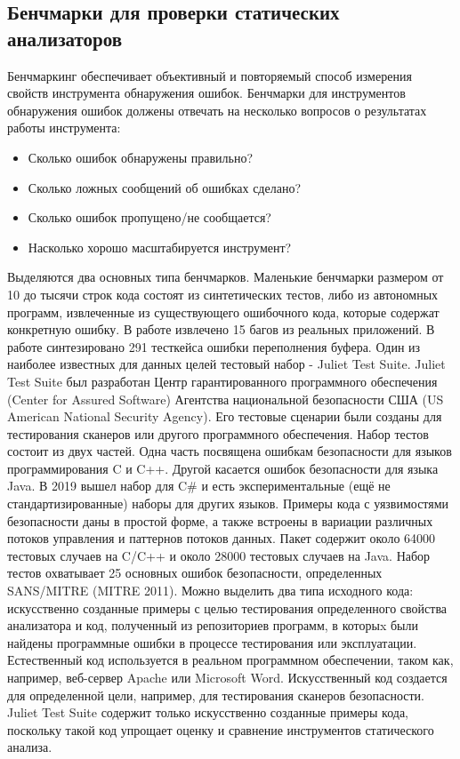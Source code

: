 \subsection{Бенчмарки для проверки статических анализаторов}
Бенчмаркинг обеспечивает объективный и повторяемый способ измерения свойств инструмента обнаружения ошибок. Бенчмарки для инструментов обнаружения 
ошибок должены отвечать на несколько вопросов о результатах работы инструмента\cite{BegBunch}: 
\begin{itemize}
    \item Сколько ошибок обнаружены правильно?
    \item Сколько ложных сообщений об ошибках сделано?
    \item Сколько ошибок пропущено/не сообщается?
    \item Насколько хорошо масштабируется инструмент?
\end{itemize}

Выделяются два основных типа бенчмарков. 
Маленькие бенчмарки размером от 10 до тысячи строк кода состоят из синтетических тестов, либо из автономных программ, извлеченные из существующего 
ошибочного кода, которые содержат конкретную ошибку. В работе\cite{Zitser} извлечено 15 багов из реальных приложений. В работе\cite{Kratkiewicz} синтезировано 
291 тесткейса ошибки переполнения буфера. Один из наиболее известных для данных целей тестовый набор - Juliet Test Suite\cite{NIST}. Juliet Test Suite был разработан Центр гарантированного 
программного обеспечения (Center for Assured Software) Агентства национальной безопасности США (US American National Security Agency).
Его тестовые сценарии были созданы для тестирования сканеров или другого программного обеспечения. Набор тестов состоит из двух частей. Одна часть 
посвящена ошибкам безопасности для языков программирования C и C++. Другой касается ошибок безопасности для языка Java. В 2019 вышел набор для C\# и 
есть экспериментальные (ещё не стандартизированные) наборы для других языков. Примеры кода с уязвимостями 
безопасности даны в простой форме, а также встроены в вариации различных потоков управления и паттернов потоков данных. Пакет содержит около 64000 
тестовых случаев на C/C++ и около 28000 тестовых случаев на Java. Набор тестов охватывает 25 основных ошибок безопасности, определенных SANS/MITRE 
(MITRE 2011)\cite{MITRE}. Можно выделить два типа исходного кода: искусственно созданные примеры с целью тестирования определенного свойства 
анализатора и код, полученный из репозиториев программ, в которыx были найдены программные ошибки в процессе тестирования или эксплуатации.
Естественный код используется в реальном программном обеспечении, таком 
как, например, веб-сервер Apache или Microsoft Word. Искусственный код создается для определенной цели, например, для тестирования сканеров 
безопасности. Juliet Test Suite содержит только искусственно созданные примеры кода, поскольку такой код упрощает оценку и сравнение инструментов 
статического анализа. 

